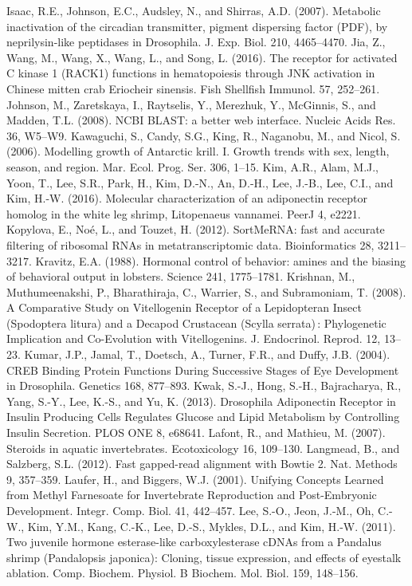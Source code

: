 Isaac, R.E., Johnson, E.C., Audsley, N., and Shirras, A.D. (2007). Metabolic inactivation of the circadian transmitter, pigment dispersing factor (PDF), by neprilysin-like peptidases in Drosophila. J. Exp. Biol. 210, 4465–4470.
Jia, Z., Wang, M., Wang, X., Wang, L., and Song, L. (2016). The receptor for activated C kinase 1 (RACK1) functions in hematopoiesis through JNK activation in Chinese mitten crab Eriocheir sinensis. Fish Shellfish Immunol. 57, 252–261.
Johnson, M., Zaretskaya, I., Raytselis, Y., Merezhuk, Y., McGinnis, S., and Madden, T.L. (2008). NCBI BLAST: a better web interface. Nucleic Acids Res. 36, W5–W9.
Kawaguchi, S., Candy, S.G., King, R., Naganobu, M., and Nicol, S. (2006). Modelling growth of Antarctic krill. I. Growth trends with sex, length, season, and region. Mar. Ecol. Prog. Ser. 306, 1–15.
Kim, A.R., Alam, M.J., Yoon, T., Lee, S.R., Park, H., Kim, D.-N., An, D.-H., Lee, J.-B., Lee, C.I., and Kim, H.-W. (2016). Molecular characterization of an adiponectin receptor homolog in the white leg shrimp, Litopenaeus vannamei. PeerJ 4, e2221.
Kopylova, E., Noé, L., and Touzet, H. (2012). SortMeRNA: fast and accurate filtering of ribosomal RNAs in metatranscriptomic data. Bioinformatics 28, 3211–3217.
Kravitz, E.A. (1988). Hormonal control of behavior: amines and the biasing of behavioral output in lobsters. Science 241, 1775–1781.
Krishnan, M., Muthumeenakshi, P., Bharathiraja, C., Warrier, S., and Subramoniam, T. (2008). A Comparative Study on Vitellogenin Receptor of a Lepidopteran Insect (Spodoptera litura) and a Decapod Crustacean (Scylla serrata) : Phylogenetic Implication and Co-Evolution with Vitellogenins. J. Endocrinol. Reprod. 12, 13–23.
Kumar, J.P., Jamal, T., Doetsch, A., Turner, F.R., and Duffy, J.B. (2004). CREB Binding Protein Functions During Successive Stages of Eye Development in Drosophila. Genetics 168, 877–893.
Kwak, S.-J., Hong, S.-H., Bajracharya, R., Yang, S.-Y., Lee, K.-S., and Yu, K. (2013). Drosophila Adiponectin Receptor in Insulin Producing Cells Regulates Glucose and Lipid Metabolism by Controlling Insulin Secretion. PLOS ONE 8, e68641.
Lafont, R., and Mathieu, M. (2007). Steroids in aquatic invertebrates. Ecotoxicology 16, 109–130.
Langmead, B., and Salzberg, S.L. (2012). Fast gapped-read alignment with Bowtie 2. Nat. Methods 9, 357–359.
Laufer, H., and Biggers, W.J. (2001). Unifying Concepts Learned from Methyl Farnesoate for Invertebrate Reproduction and Post-Embryonic Development. Integr. Comp. Biol. 41, 442–457.
Lee, S.-O., Jeon, J.-M., Oh, C.-W., Kim, Y.M., Kang, C.-K., Lee, D.-S., Mykles, D.L., and Kim, H.-W. (2011). Two juvenile hormone esterase-like carboxylesterase cDNAs from a Pandalus shrimp (Pandalopsis japonica): Cloning, tissue expression, and effects of eyestalk ablation. Comp. Biochem. Physiol. B Biochem. Mol. Biol. 159, 148–156.
